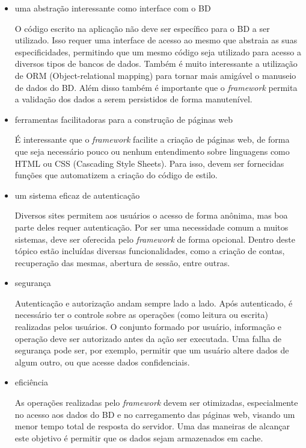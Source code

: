 \begin{itemize}
\item uma abstração interessante como interface com o BD

O código escrito na aplicação não deve ser específico para o BD a ser utilizado. Isso requer uma interface de acesso ao mesmo que abstraia as suas especificidades, permitindo que um mesmo código seja utilizado para acesso a diversos tipos de bancos de dados. Também é muito interessante a utilização de ORM (Object-relational mapping)
para tornar mais amigável o manuseio de dados do BD. Além disso também é importante que o \textit{framework} permita a validação dos dados a serem persistidos de forma manutenível.

\item ferramentas facilitadoras para a construção de páginas web

É interessante que o \textit{framework} facilite a criação de páginas web, de forma que seja necessário pouco ou nenhum entendimento sobre linguagens como HTML ou CSS (Cascading Style Sheets).
Para isso, devem ser fornecidas funções que automatizem a criação do código de estilo.

\item um sistema eficaz de autenticação

Diversos sites permitem aos usuários o acesso de forma anônima, mas boa parte deles requer autenticação. Por ser uma necessidade comum a muitos sistemas, deve ser oferecida pelo \textit{framework} de forma opcional. Dentro deste tópico estão incluídas diversas funcionalidades, como a criação de contas, recuperação das mesmas, abertura de sessão, entre outras.

\item segurança

Autenticação e autorização andam sempre lado a lado. Após autenticado, é necessário ter o controle sobre as operações (como leitura ou escrita) realizadas pelos usuários. O conjunto formado por usuário, informação e operação deve ser autorizado antes da ação ser executada. Uma falha de segurança pode ser, por exemplo, permitir que um usuário altere dados de algum outro, ou que acesse dados confidenciais.

\item eficiência

As operações realizadas pelo \textit{framework} devem ser otimizadas, especialmente no acesso aos dados do BD e no carregamento das páginas web, visando um menor tempo total de resposta do servidor. Uma das maneiras de alcançar este objetivo é permitir que os dados sejam armazenados em cache.


\end{itemize}
